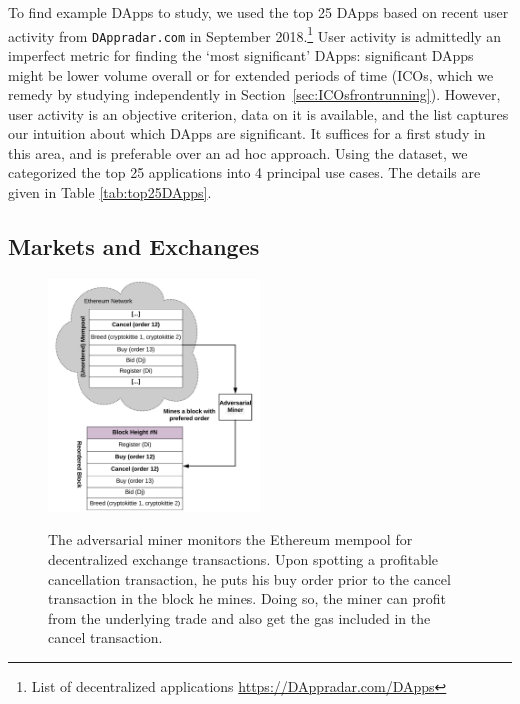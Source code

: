 

To find example DApps to study, we used the top 25 DApps based on recent user activity from \texttt{DAppradar.com} in September 2018.\footnote{List of decentralized applications \url{https://DAppradar.com/DApps}} User activity is admittedly an imperfect metric for finding the `most significant' DApps: significant DApps might be lower volume overall or for extended periods of time (\eg ICOs, which we remedy by studying independently in Section~\ref{sec:ICOsfrontrunning}). However, user activity is an objective criterion, data on it is available, and the list captures our intuition about which DApps are significant. It suffices for a first study in this area, and is preferable over an ad hoc approach. Using the dataset, we categorized the top 25 applications into 4 principal use cases. The details are given in Table \ref{tab:top25DApps}.


\subsection{Markets and Exchanges} \label{sec:frontrunningExchanges}

\begin{figure}[t]
\centering
{\includegraphics[width=0.5\textwidth]{figures/Miner_reorder_frontrun.png}}
{\caption[Miner Front-running Flow]{The adversarial miner monitors the Ethereum mempool for decentralized exchange transactions. Upon spotting a profitable cancellation transaction, he puts his buy order prior to the cancel transaction in the block he mines. Doing so, the miner can profit from the underlying trade and also get the gas included in the cancel transaction.}\label{fig:MinerFrontrunning}}
\end{figure}


